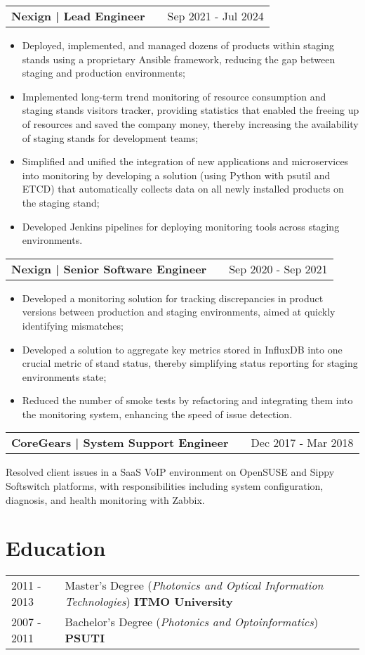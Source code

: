 \documentclass[a4paper,12pt]{article}
\makeatletter
\newenvironment{jobshort}[2]
    {
    \begin{tabularx}{\linewidth}{@{}l X r@{}}
    \textbf{#1} & \hfill &  #2 \\[3.75pt]
    \end{tabularx}
    }
    {
    }
\newenvironment{joblong}[2]
    {
    \begin{tabularx}{\linewidth}{@{}l X r@{}}
    \textbf{#1} & \hfill &  #2 \\[3.75pt]
    \end{tabularx}
    \begin{minipage}[t]{\linewidth}
    \begin{itemize}[nosep,after=\strut, leftmargin=1em, itemsep=3pt,label=--]
    }
    {
    \end{itemize}
    \end{minipage}    
    }
\makeatother
\begin{document}
\begin{joblong}{Nexign | Lead Engineer}{Sep 2021 - Jul 2024}
\item Deployed, implemented, and managed dozens of products within staging stands using a proprietary Ansible framework, reducing the gap between staging and production environments;
\item Implemented long-term trend monitoring of resource consumption and staging stands visitors tracker, providing statistics that enabled the freeing up of resources and saved the company money, thereby increasing the availability of staging stands for development teams;
\item Simplified and unified the integration of new applications and microservices into monitoring by developing a solution (using Python with psutil and ETCD) that automatically collects data on all newly installed products on the staging stand;
\item Developed Jenkins pipelines for deploying monitoring tools across staging environments.
\end{joblong}

\begin{joblong}{Nexign | Senior Software Engineer}{Sep 2020 - Sep 2021}
\item Developed a monitoring solution for tracking discrepancies in product versions between production and staging environments, aimed at quickly identifying mismatches;
\item Developed a solution to aggregate key metrics stored in InfluxDB into one crucial metric of stand status, thereby simplifying status reporting for staging environments state;
\item Reduced the number of smoke tests by refactoring and integrating them into the monitoring system, enhancing the speed of issue detection.
\end{joblong}

\begin{jobshort}{CoreGears | System Support Engineer}{Dec 2017 - Mar 2018}
Resolved client issues in a SaaS VoIP environment on OpenSUSE and Sippy Softswitch platforms, with responsibilities including system configuration, diagnosis, and health monitoring with Zabbix.
\end{jobshort}

\section{Education}
\begin{tabularx}{\linewidth}{@{}l X@{}}	
2011 - 2013 & Master’s Degree (\textit{Photonics and Optical Information Technologies}) \hfill \textbf{ITMO University}  \\ 
2007 - 2011 & Bachelor's Degree (\textit{Photonics and Optoinformatics}) \hfill \textbf{PSUTI} \\ 
\end{tabularx}
\end{document}
